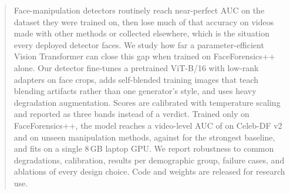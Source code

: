 \begin{abstract}
Face-manipulation detectors routinely reach near-perfect AUC on the dataset they were trained on,
then lose much of that accuracy on videos made with other methods or collected elsewhere, which
is the situation every deployed detector faces. We study how far a parameter-efficient Vision
Transformer can close this gap when trained on FaceForensics++ alone. Our detector fine-tunes a
pretrained ViT-B/16 with low-rank adapters on face crops, adds self-blended training images that
teach blending artifacts rather than one generator's style, and uses heavy degradation
augmentation. Scores are calibrated with temperature scaling and reported as three bands
instead of a verdict. Trained only on FaceForensics++, the model reaches a video-level AUC of
 on Celeb-DF v2 and  on unseen manipulation methods, against
 for the strongest baseline, and fits on a single 8\,GB laptop GPU. We report
robustness to common degradations, calibration, results per demographic group, failure cases,
and ablations of every design choice. Code and weights are released for research use.
\end{abstract}
